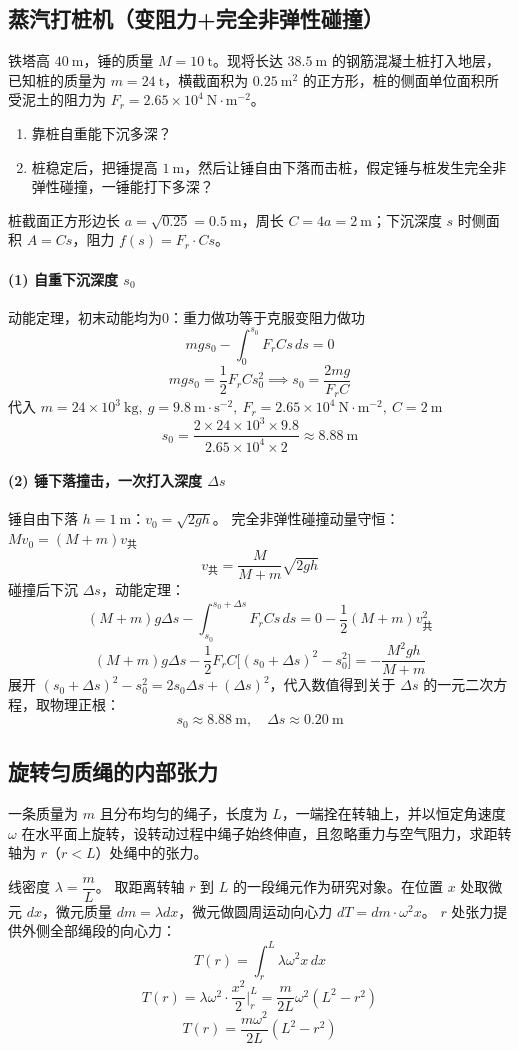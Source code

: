\subsection{蒸汽打桩机（变阻力+完全非弹性碰撞）}
铁塔高 $40\ \mathrm{m}$，锤的质量 $M=10\ \mathrm{t}$。现将长达 $38.5\ \mathrm{m}$ 的钢筋混凝土桩打入地层，已知桩的质量为 $m=24\ \mathrm{t}$，横截面积为 $0.25\ \mathrm{m^2}$ 的正方形，桩的侧面单位面积所受泥土的阻力为 $F_r=2.65\times 10^4\ \mathrm{N\cdot m^{-2}}$。
\begin{enumerate}
    \item 靠桩自重能下沉多深？
    \item 桩稳定后，把锤提高 $1\ \mathrm{m}$，然后让锤自由下落而击桩，假定锤与桩发生完全非弹性碰撞，一锤能打下多深？
\end{enumerate}
\begin{solution}
桩截面正方形边长 $a=\sqrt{0.25}=0.5\ \mathrm{m}$，周长 $C=4a=2\ \mathrm{m}$；下沉深度 $s$ 时侧面积 $A=C s$，阻力 $f(s)=F_r \cdot C s$。
\paragraph{(1) 自重下沉深度 $s_0$}
动能定理，初末动能均为0：重力做功等于克服变阻力做功
\[
mg s_0 - \int_{0}^{s_0} F_r C s \,ds = 0
\]
\[
mg s_0 = \frac12 F_r C s_0^2 \implies s_0=\frac{2mg}{F_r C}
\]
代入 $m=24\times10^3\ \mathrm{kg},\ g=9.8\ \mathrm{m\cdot s^{-2}},\ F_r=2.65\times10^4\ \mathrm{N\cdot m^{-2}},\ C=2\ \mathrm{m}$
\[
s_0=\frac{2\times 24\times10^3\times9.8}{2.65\times10^4 \times 2}\approx 8.88\ \mathrm{m}
\]
\paragraph{(2) 锤下落撞击，一次打入深度 $\Delta s$}
锤自由下落 $h=1\ \mathrm{m}$：$v_0=\sqrt{2gh}$。
完全非弹性碰撞动量守恒：$M v_0=(M+m) v_\text{共}$
\[
v_\text{共}=\frac{M}{M+m}\sqrt{2gh}
\]
碰撞后下沉 $\Delta s$，动能定理：
\[
(M+m)g\Delta s - \int_{s_0}^{s_0+\Delta s} F_r C s\,ds = 0-\frac12(M+m)v_\text{共}^2
\]
\[
(M+m)g\Delta s - \frac12 F_r C \big[(s_0+\Delta s)^2-s_0^2\big] = -\frac{M^2 g h}{M+m}
\]
展开 $(s_0+\Delta s)^2-s_0^2=2s_0\Delta s+(\Delta s)^2$，代入数值得到关于 $\Delta s$ 的一元二次方程，取物理正根：
\[
\boxed{s_0\approx 8.88\ \mathrm{m},\quad \Delta s\approx 0.20\ \mathrm{m}}
\]
\end{solution}
\subsection{旋转匀质绳的内部张力}
一条质量为 $m$ 且分布均匀的绳子，长度为 $L$，一端拴在转轴上，并以恒定角速度 $\omega$ 在水平面上旋转，设转动过程中绳子始终伸直，且忽略重力与空气阻力，求距转轴为 $r$（$r<L$）处绳中的张力。
\begin{solution}
线密度 $\lambda = \dfrac{m}{L}$。
取距离转轴 $r$ 到 $L$ 的一段绳元作为研究对象。在位置 $x$ 处取微元 $dx$，微元质量 $dm=\lambda dx$，微元做圆周运动向心力 $dT = dm \cdot \omega^2 x$。
$r$ 处张力提供外侧全部绳段的向心力：
\[
T(r) = \int_{r}^{L} \lambda \omega^2 x \,dx
\]
\[
T(r) = \lambda \omega^2 \cdot \frac{x^2}{2}\bigg|_{r}^{L}
= \frac{m}{2L}\omega^2\left(L^2-r^2\right)
\]
\[
\boxed{T(r) = \frac{m\omega^2}{2L}\left(L^2-r^2\right)}
\]
\end{solution}

